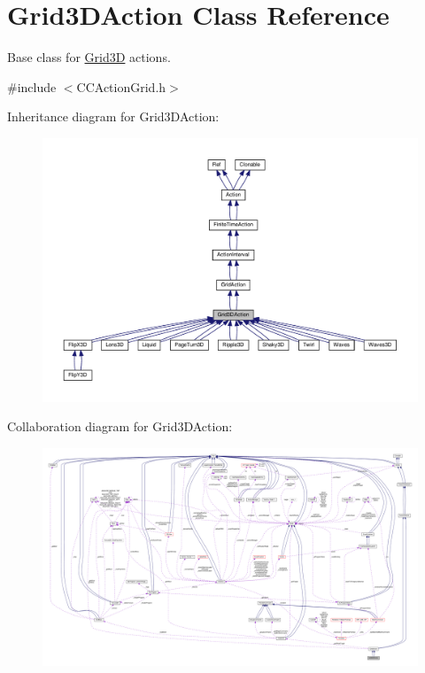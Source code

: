 \hypertarget{classGrid3DAction}{}\section{Grid3\+D\+Action Class Reference}
\label{classGrid3DAction}


Base class for \hyperlink{classGrid3D}{Grid3D} actions.  




{\ttfamily \#include $<$C\+C\+Action\+Grid.\+h$>$}



Inheritance diagram for Grid3\+D\+Action\+:
\nopagebreak
\begin{figure}[H]
\begin{center}
\leavevmode
\includegraphics[width=350pt]{classGrid3DAction__inherit__graph}
\end{center}
\end{figure}


Collaboration diagram for Grid3\+D\+Action\+:
\nopagebreak
\begin{figure}[H]
\begin{center}
\leavevmode
\includegraphics[width=350pt]{classGrid3DAction__coll__graph}
\end{center}
\end{figure}
